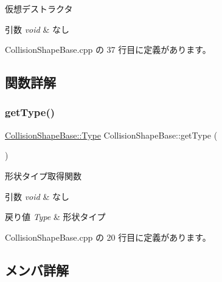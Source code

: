 仮想デストラクタ 


\begin{DoxyParams}{引数}
{\em void} & なし \\
\hline
\end{DoxyParams}


 Collision\+Shape\+Base.\+cpp の 37 行目に定義があります。



\subsection{関数詳解}
\mbox{\label{class_collision_shape_base_a3dac385b3718f80171046cde33da04b1}} 
\subsubsection{\texorpdfstring{get\+Type()}{getType()}}
{\footnotesize\ttfamily \mbox{\hyperlink{class_collision_shape_base_a8abcef092855ad0ca191047044b002cb}{Collision\+Shape\+Base\+::\+Type}} Collision\+Shape\+Base\+::get\+Type (\begin{DoxyParamCaption}{ }\end{DoxyParamCaption})}



形状タイプ取得関数 


\begin{DoxyParams}{引数}
{\em void} & なし \\
\hline
\end{DoxyParams}

\begin{DoxyRetVals}{戻り値}
{\em Type} & 形状タイプ \\
\hline
\end{DoxyRetVals}


 Collision\+Shape\+Base.\+cpp の 20 行目に定義があります。



\subsection{メンバ詳解}
\mbox{\label{class_collision_shape_base_a46413b1e4d4b3a35075232fa9012addb}} 
